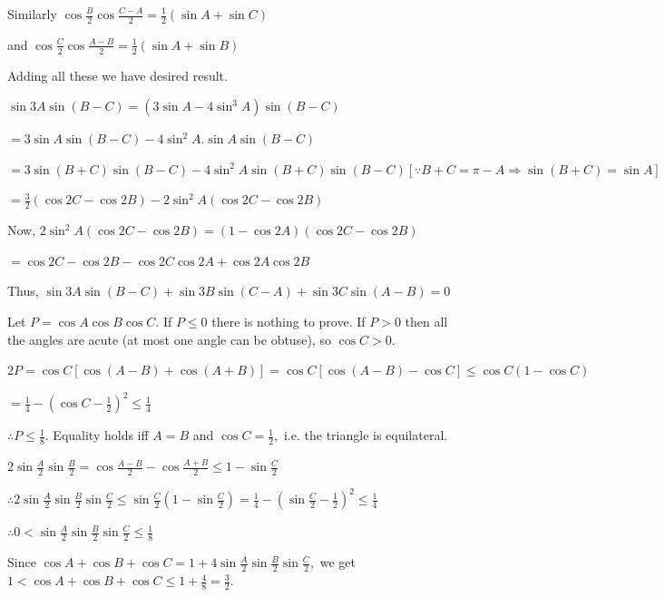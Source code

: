  Similarly $\cos\frac{B}{2}\cos\frac{C - A}{2} = \frac{1}{2}(\sin A + \sin C)$

  and $\cos\frac{C}{2}\cos\frac{A - B}{2} = \frac{1}{2}(\sin A + \sin B)$

  Adding all these we have desired result.

\item $\sin 3A\sin(B - C) = (3\sin A - 4\sin^3A)\sin(B - C)$

  $= 3\sin A\sin(B - C) - 4\sin^2A.\sin A\sin(B - C)$

  $= 3\sin(B + C)\sin(B - C) - 4\sin^2A\sin(B + C)\sin(B - C)[\because B + C = \pi - A \Rightarrow \sin(B + C) = \sin A]$

  $= \frac{3}{2}(\cos2C - \cos2B) - 2\sin^2A(\cos2C - \cos2B)$

  Now, $2\sin^2A(\cos2C - \cos2B) = (1 - \cos 2A)(\cos2C - \cos2B)$

  $= \cos 2C - \cos 2B - \cos2C \cos 2A + \cos 2A\cos 2B$

  Thus, $\sin 3A\sin(B - C) + \sin 3B\sin(C - A) + \sin3C\sin(A - B) = 0$
\stopitemize

\subject{Challenging Problems}
\startitemize[n, 1*broad]
\item Let $P = \cos A\cos B\cos C$. If $P \leq 0$ there is nothing to prove. If $P > 0$ then all the angles are acute
  (at most one angle can be obtuse), so $\cos C > 0$.

  $2P = \cos C[\cos(A - B) + \cos(A + B)] = \cos C[\cos(A - B) - \cos C] \leq \cos C(1 - \cos C)$

  $= \frac{1}{4} - \left(\cos C - \frac{1}{2}\right)^2 \leq \frac{1}{4}$

  $\therefore P \leq \frac{1}{8}$. Equality holds iff $A = B$ and $\cos C = \frac{1}{2},$ i.e. the triangle is
  equilateral.

\item $2\sin\frac{A}{2}\sin\frac{B}{2} = \cos\frac{A - B}{2} - \cos\frac{A + B}{2} \leq 1 - \sin\frac{C}{2}$

  $\therefore 2\sin\frac{A}{2}\sin\frac{B}{2}\sin\frac{C}{2} \leq \sin\frac{C}{2}\left(1 - \sin\frac{C}{2}\right) =
  \frac{1}{4} - \left(\sin\frac{C}{2} - \frac{1}{2}\right)^2 \leq \frac{1}{4}$

  $\therefore 0 < \sin\frac{A}{2}\sin\frac{B}{2}\sin\frac{C}{2} \leq \frac{1}{8}$

  Since $\cos A + \cos B + \cos C = 1 + 4\sin\frac{A}{2}\sin\frac{B}{2}\sin\frac{C}{2},$ we get $1 < \cos A + \cos B +
  \cos C \leq 1 + \frac{4}{8} = \frac{3}{2}$.

